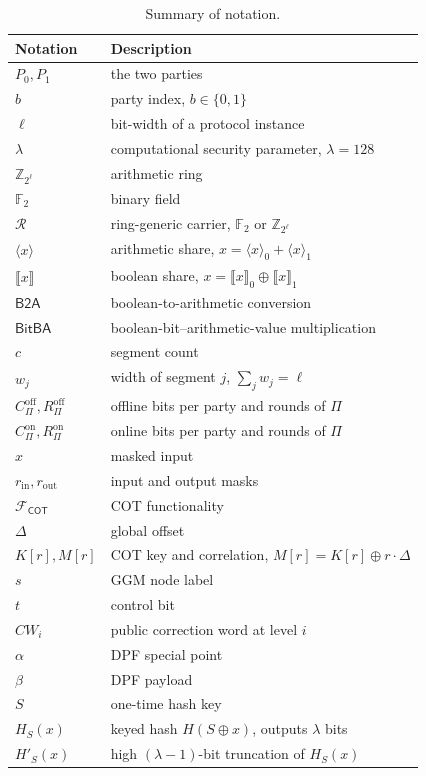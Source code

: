 \documentclass[journal]{IEEEtran}
\theoremstyle{definition}
\theoremstyle{plain}
\newcommand{\Z}{\mathbb{Z}}
\newcommand{\F}{\mathbb{F}}
\newcommand{\R}{\mathcal{R}}                              %
\newcommand{\ashare}[1]{\langle #1 \rangle}             %
\newcommand{\bshare}[1]{\llbracket #1 \rrbracket}        %
\newcommand{\Fcot}{\mathcal{F}_{\mathsf{COT}}}
\newcommand{\BitBA}{\mathsf{BitBA}}
\newcommand{\xhat}{\hat{x}}
\newcommand{\nseg}{c}                              %
\newcommand{\wseg}{w}                              %
\begin{document}
\begin{table}[t]
\centering
\caption{Summary of notation.}
\label{tab:notation}
\renewcommand{\arraystretch}{1.2}
\begin{tabular}{ll}
\toprule
Notation & Description \\
\midrule
$P_0,P_1$ & the two parties \\
$b$ & party index, $b\in\{0,1\}$ \\
$\ell$ & bit-width of a protocol instance \\
$\lambda$ & computational security parameter, $\lambda=128$ \\
$\Z_{2^{\ell}}$ & arithmetic ring \\
$\F_2$ & binary field \\
$\R$ & ring-generic carrier, $\F_2$ or $\Z_{2^{\ell}}$ \\
$\ashare{x}$ & arithmetic share, $x=\ashare{x}_0+\ashare{x}_1$ \\
$\bshare{x}$ & boolean share, $x=\bshare{x}_0\oplus\bshare{x}_1$ \\
$\mathsf{B2A}$ & boolean-to-arithmetic conversion \\
$\BitBA$ & boolean-bit--arithmetic-value multiplication \\
$\nseg$ & segment count \\
$\wseg_j$ & width of segment $j$, $\sum_j\wseg_j=\ell$ \\
$C^{\mathrm{off}}_{\Pi},R^{\mathrm{off}}_{\Pi}$ & offline bits per party and rounds of $\Pi$ \\
$C^{\mathrm{on}}_{\Pi},R^{\mathrm{on}}_{\Pi}$ & online bits per party and rounds of $\Pi$ \\
$\xhat$ & masked input \\
$r_{\mathrm{in}},r_{\mathrm{out}}$ & input and output masks \\
$\Fcot$ & COT functionality \\
$\Delta$ & global offset \\
$K[r],M[r]$ & COT key and correlation, $M[r]=K[r]\oplus r\cdot\Delta$ \\
$s$ & GGM node label \\
$t$ & control  bit \\
$\mathit{CW}_i$ & public correction word at level $i$ \\
$\alpha$ & DPF special point \\
$\beta$ & DPF payload \\
$S$ & one-time hash key \\
$H_S(x)$ & keyed hash $H(S\oplus x)$, outputs $\lambda$ bits \\
$H'_S(x)$ & high $(\lambda{-}1)$-bit truncation of $H_S(x)$ \\
\bottomrule
\end{tabular}
\end{table}
\end{document}
